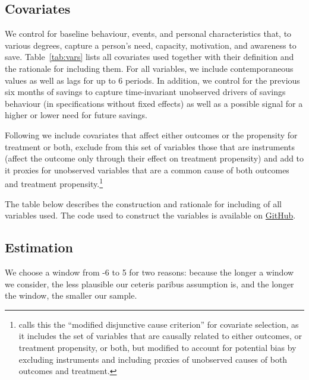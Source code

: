 \subsection{Covariates}%
\label{sub:covariates}

We control for baseline behaviour, events, and personal characteristics that,
to various degrees, capture a person's need, capacity, motivation, and
awareness to save. Table~\ref{tab:vars} lists all covariates used
together with their definition and the rationale for including them. For all
variables, we include contemporaneous values as well as lags for up to 6
periods. In addition, we control for the previous six months of savings to
capture time-invariant unobserved drivers of savings behaviour (in
specifications without fixed effects) as well as a possible signal for a higher
or lower need for future savings.

Following \citet{vanderweele2019principles} we include covariates that affect
either outcomes or the propensity for treatment or both, exclude from this
set of variables those that are instruments (affect the outcome only through their effect on
treatment propensity) and add to it proxies for unobserved variables that are a
common cause of both outcomes and treatment propensity.\footnote{
\citet{vanderweele2019principles} calls this the ``modified disjunctive cause
criterion'' for covariate selection, as it includes the set of variables that are causally
related to either outcomes, or treatment propensity, or both, but modified to
account for potential bias by excluding instruments and including proxies of
unobserved causes of both outcomes and treatment.}

The table below describes the construction and rationale for including of all
variables used. The code used to construct the variables is available on
\href{https://github.com/fabiangunzinger/mdb_eval/blob/d094f8cd364f64bbe3d4e644abbff726af86de2f/src/data/aggregators.py}{GitHub}.




\subsection{Estimation}%
\label{sub:difference_in_difference}

We choose a window from -6 to 5 for two reasons: because the longer a window we
consider, the less plausible our ceteris paribus assumption is, and the longer
the window, the smaller our sample.


